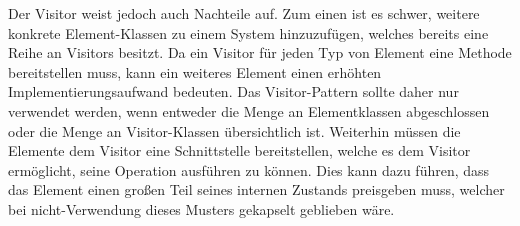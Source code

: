 Der Visitor weist jedoch auch Nachteile auf. Zum einen ist es schwer, weitere konkrete Element-Klassen zu einem System hinzuzufügen, welches bereits eine Reihe an Visitors besitzt. Da ein Visitor für jeden Typ von Element eine Methode bereitstellen muss, kann ein weiteres Element einen erhöhten Implementierungsaufwand bedeuten. Das Visitor-Pattern sollte daher nur verwendet werden, wenn entweder die Menge an Elementklassen abgeschlossen oder die Menge an Visitor-Klassen übersichtlich ist. Weiterhin müssen die Elemente dem Visitor eine Schnittstelle bereitstellen, welche es dem Visitor ermöglicht, seine Operation ausführen zu können. Dies kann dazu führen, dass das Element einen großen Teil seines internen Zustands preisgeben muss, welcher bei nicht-Verwendung dieses Musters gekapselt geblieben wäre. \cite{gamma_design_1995}